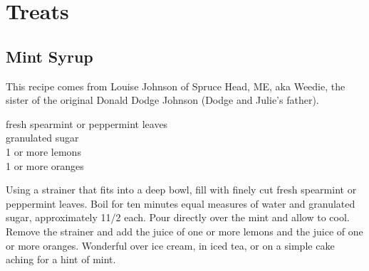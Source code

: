 \chapter{Treats}

\section{Mint Syrup}

\begin{open}
    This recipe comes from Louise Johnson of Spruce Head, ME, aka Weedie, the sister of the original Donald Dodge Johnson (Dodge and Julie’s father).
\end{open}
\begin{ingredients}
    fresh spearmint or peppermint leaves\\
    granulated sugar\\
    1 or more lemons\\
    1 or more oranges\\
\end{ingredients}
Using a strainer that fits into a deep bowl, fill with finely cut fresh spearmint or peppermint leaves. Boil for ten minutes equal measures of water and granulated sugar, approximately 1\SI{1/2}{\cup} each. Pour directly over the mint and allow to cool. Remove the strainer and add the juice of one or more lemons and the juice of one or more oranges. Wonderful over ice cream, in iced tea, or on a simple cake aching for a hint of mint.